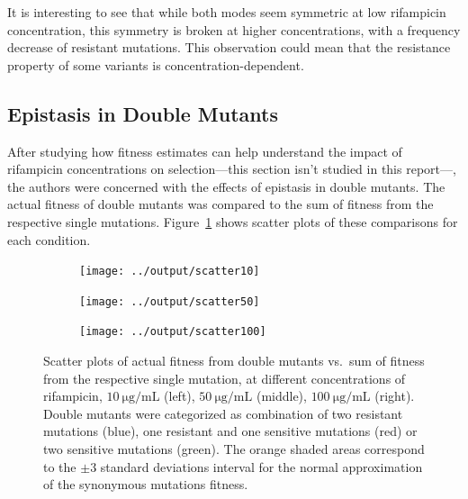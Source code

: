 \documentclass[12pt]{article}
\begin{document}
  It is interesting to see that while both modes seem symmetric
  at low rifampicin concentration, this symmetry is broken at higher
  concentrations, with a frequency decrease of resistant mutations. This
  observation could mean that the resistance property of some variants is
  concentration-dependent.

  \subsection{Epistasis in Double Mutants}

  After studying how fitness estimates can help understand the impact of
  rifampicin concentrations on selection---this section isn't studied in this
  report---, the authors were concerned with the effects of epistasis in double
  mutants. The actual fitness of double mutants was compared to the sum of
  fitness from the respective single mutations. Figure~\ref{fig:epidouble}
  shows scatter plots of these comparisons for each condition.

  \begin{figure}[ht]
    \begin{subfigure}{.33\textwidth}
      \centering
      \texttt{[image: ../output/scatter10]}
    \end{subfigure}
    \begin{subfigure}{.33\textwidth}
      \centering
      \texttt{[image: ../output/scatter50]}
    \end{subfigure}
    \begin{subfigure}{.33\textwidth}
      \centering
      \texttt{[image: ../output/scatter100]}
    \end{subfigure}
    \caption{Scatter plots of actual fitness from double mutants vs.\ sum of
    fitness from the respective single mutation, at different concentrations of
    rifampicin, $\SI{10}{\micro\gram\per\milli\liter}$ (left),
    $\SI{50}{\micro\gram\per\milli\liter}$ (middle),
    $\SI{100}{\micro\gram\per\milli\liter}$ (right). Double mutants were
    categorized as combination of two resistant mutations (blue), one resistant
    and one sensitive mutations (red) or two sensitive mutations (green). The
    orange shaded areas correspond to the $\pm 3$ standard deviations interval
    for the normal approximation of the synonymous mutations fitness.}%
    \label{fig:epidouble}
  \end{figure}
\end{document}
